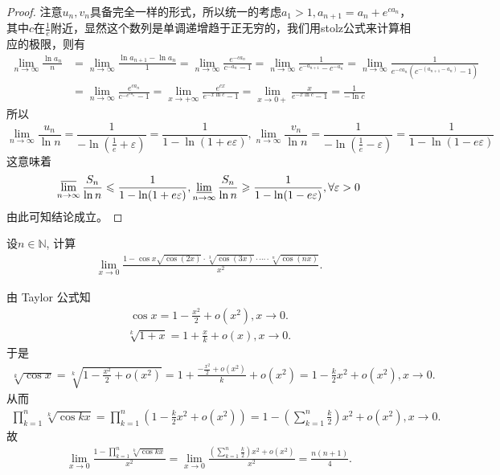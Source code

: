 \documentclass[../../main.tex]{subfiles}%
\begin{document}
\begin{proof}
注意\(u_n,v_n\)具备完全一样的形式，所以统一的考虑\(a_1>1,a_{n + 1}=a_n + e^{ca_n}\)，其中\(c\)在\(\frac{1}{e}\)附近，显然这个数列是单调递增趋于正无穷的，我们用stolz公式来计算相应的极限，则有
\begin{align*}
\lim_{n\rightarrow\infty}\frac{\ln a_n}{n}&=\lim_{n\rightarrow\infty}\frac{\ln a_{n + 1}-\ln a_n}{1}=\lim_{n\rightarrow\infty}\frac{e^{-ca_n}}{c^{-a_n}-1}=\lim_{n\rightarrow\infty}\frac{1}{c^{-a_{n + 1}}-c^{-a_n}}=\lim_{n\rightarrow\infty}\frac{1}{e^{-ca_n}(c^{-(a_{n + 1}-a_n)}-1)}\\
&=\lim_{n\rightarrow\infty}\frac{e^{ca_n}}{c^{-e^{ca_n}}-1}=\lim_{x\rightarrow+\infty}\frac{e^{cx}}{e^{-x\ln c}-1}=\lim_{x\rightarrow0+}\frac{x}{e^{-x\ln c}-1}=\frac{1}{-\ln c}
\end{align*}
所以
\[\lim_{n\rightarrow\infty}\frac{u_n}{\ln n}=\frac{1}{-\ln(\frac{1}{e}+\varepsilon)}=\frac{1}{1-\ln(1 + e\varepsilon)},\lim_{n\rightarrow\infty}\frac{v_n}{\ln n}=\frac{1}{-\ln(\frac{1}{e}-\varepsilon)}=\frac{1}{1-\ln(1 - e\varepsilon)}\]
这意味着
\[\varlimsup_{n\rightarrow\infty}\frac{S_n}{\ln n}\leqslant \frac{1}{1-\ln(1 + e\varepsilon)},\varliminf_{n\rightarrow\infty}\frac{S_n}{\ln n}\geqslant \frac{1}{1-\ln(1 - e\varepsilon)},\forall\varepsilon>0\]
由此可知结论成立。

\end{proof}

\begin{example}
设$n \in \mathbb{N}$, 计算
\begin{align*}
\lim_{x \to 0} \frac{1 - \cos x \sqrt{\cos (2x)} \cdot \sqrt[3]{\cos (3x)} \cdot \cdots \cdot \sqrt[n]{\cos (nx)}}{x^2}.
\end{align*}
\end{example}
\begin{solution}

由 Taylor 公式知
\begin{align*}
\cos x = 1 - \frac{x^2}{2} + o(x^2), x \to 0.
\end{align*}
\begin{align*}
\sqrt[k]{1 + x} = 1 + \frac{x}{k} + o(x), x \to 0.
\end{align*}
于是
\begin{align*}
\sqrt[k]{\cos x} = \sqrt[k]{1 - \frac{x^2}{2} + o(x^2)} = 1 + \frac{-\frac{x^2}{2} + o(x^2)}{k} + o(x^2) = 1 - \frac{k}{2}x^2 + o(x^2), x \to 0.
\end{align*}
从而
\begin{align*}
\prod_{k=1}^n \sqrt[k]{\cos kx} = \prod_{k=1}^n \left( 1 - \frac{k}{2}x^2 + o(x^2) \right) = 1 - \left( \sum_{k=1}^n \frac{k}{2} \right) x^2 + o(x^2), x \to 0.
\end{align*}
故
\begin{align*}
\lim_{x \to 0} \frac{1 - \prod\limits_{k=1}^n \sqrt[k]{\cos kx}}{x^2} = \lim_{x \to 0} \frac{\left( \sum\limits_{k=1}^n \frac{k}{2} \right) x^2 + o(x^2)}{x^2} = \frac{n(n + 1)}{4}.
\end{align*}

\end{solution}
\end{document}
